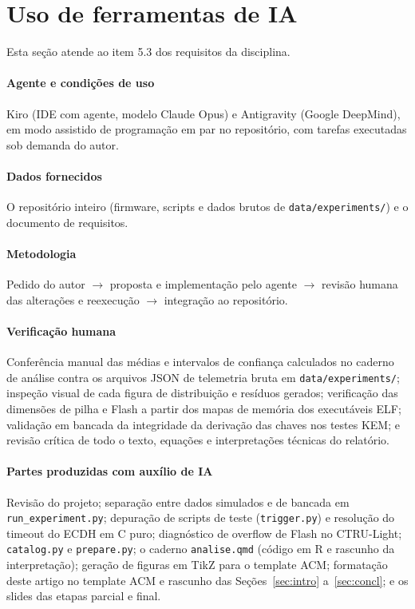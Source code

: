 \documentclass[acmsmall,nonacm,language=english,language=brazilian]{acmart}
\begin{document}
\section{Uso de ferramentas de IA}
\label{sec:ia}
Esta seção atende ao item 5.3 dos requisitos da disciplina.

\paragraph{Agente e condições de uso} Kiro (IDE com agente, modelo Claude
Opus) e Antigravity (Google DeepMind), em modo assistido de programação em par
no repositório, com tarefas executadas sob demanda do autor.

\paragraph{Dados fornecidos} O repositório inteiro (firmware, scripts e dados
brutos de \texttt{data/experiments/}) e o documento de requisitos.

\paragraph{Metodologia} Pedido do autor $\rightarrow$ proposta e implementação
pelo agente $\rightarrow$ revisão humana das alterações e reexecução
$\rightarrow$ integração ao repositório.

\paragraph{Verificação humana}
Conferência manual das médias e intervalos de confiança calculados no
caderno de análise contra os arquivos JSON de telemetria bruta em
\texttt{data/experiments/}; inspeção visual de cada figura de distribuição e
resíduos gerados; verificação das dimensões de pilha e Flash a partir dos
mapas de memória dos executáveis ELF; validação em bancada da integridade da
derivação das chaves nos testes KEM; e revisão crítica de todo o texto,
equações e interpretações técnicas do relatório.

\paragraph{Partes produzidas com auxílio de IA} Revisão do projeto; separação
entre dados simulados e de bancada em \texttt{run\_experiment.py}; depuração
de scripts de teste (\texttt{trigger.py}) e resolução do timeout do ECDH em C puro;
diagnóstico de overflow de Flash no CTRU-Light;
\texttt{catalog.py} e \texttt{prepare.py}; o caderno \texttt{analise.qmd}
(código em R e rascunho da interpretação); geração de figuras em TikZ para o
template ACM; formatação
deste artigo no template ACM e rascunho das Seções~\ref{sec:intro} a~\ref{sec:concl};
e os slides das etapas parcial e final.
\end{document}
